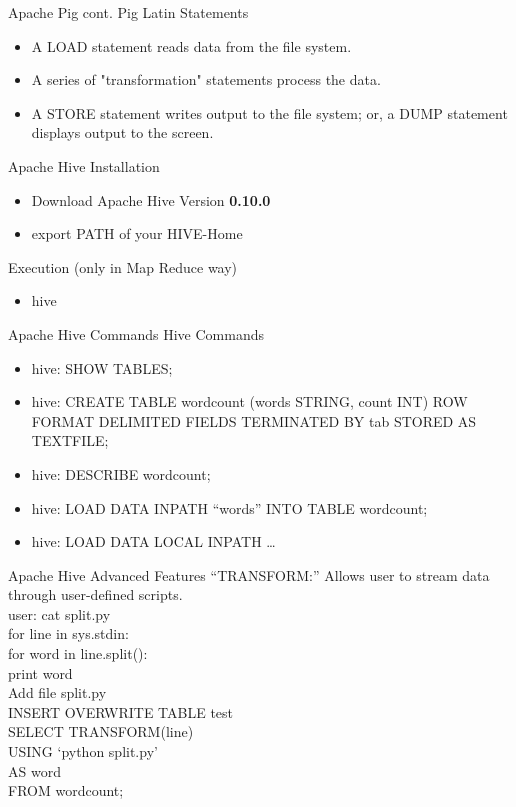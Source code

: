 \documentclass{beamer}
\begin{document}
\begin{frame}{Apache Pig cont.}
Pig Latin Statements
\begin{itemize}
\item A LOAD statement reads data from the file system.
\item A series of "transformation" statements process the data.
\item A STORE statement writes output to the file system; or, a DUMP statement displays output to the screen.
\end{itemize}
\end{frame}

\begin{frame}{Apache Hive}
Installation
\begin{itemize}
\item Download Apache Hive Version \textbf{0.10.0}
\item export PATH of your HIVE-Home
\end{itemize}
Execution (only in Map Reduce way)
\begin{itemize}
\item hive
\end{itemize}
\end{frame}

\begin{frame}{Apache Hive Commands}
Hive Commands
\begin{itemize}
\item hive: SHOW TABLES;
\item hive: CREATE TABLE wordcount (words STRING, count INT) ROW FORMAT DELIMITED FIELDS TERMINATED BY tab STORED AS TEXTFILE;
\item hive: DESCRIBE wordcount;
\item hive: LOAD DATA INPATH “words” INTO TABLE wordcount;
\item hive: LOAD DATA LOCAL INPATH …
\end{itemize}
\end{frame}

\begin{frame}{Apache Hive Advanced Features}
“TRANSFORM:” Allows user to stream data through user-defined scripts. \\
user: cat split.py\\
for line in sys.stdin:\\
	for word in line.split():\\
		print word\\
		Add file split.py\\
INSERT OVERWRITE TABLE test\\
SELECT TRANSFORM(line)\\
USING ‘python split.py’\\
AS word\\
FROM wordcount;\\
\end{frame}
\end{document}
